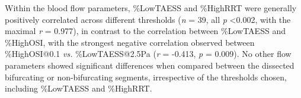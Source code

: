 \documentclass[preprint,11pt,review]{elsarticle}
\begin{document}
Within the blood flow parameters, \%LowTAESS and \%HighRRT were generally  positively correlated across different thresholds (\textit{n} = 39, all \textit{p} \textless 0.002, with the maximal \textit{r} = 0.977), in contrast to the correlation between \%LowTAESS and \%HighOSI, with the strongest negative correlation observed between \%HighOSI@0.1 \textit{vs.} \%LowTAESS@2.5Pa (\textit{r} = -0.413, \textit{p} = 0.009). No other flow parameters showed significant differences when compared between the dissected bifurcating or non-bifurcating segments, irrespective of the thresholds chosen, including \%LowTAESS and \%HighRRT. 




\end{document}
